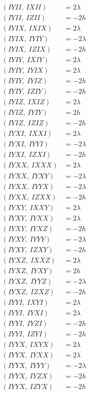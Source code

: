 \documentclass{article}
\begin{document}
\begin{align*}
  (IYII,\ IXII) &= 2 \lambda \\
  (IYII,\ IZII) &= - 2 h \\
  (IYIX,\ IXIX) &= 2 \lambda \\
  (IYIX,\ IYIY) &= - 2 \lambda \\
  (IYIX,\ IZIX) &= - 2 h \\
  (IYIY,\ IXIY) &= 2 \lambda \\
  (IYIY,\ IYIX) &= 2 \lambda \\
  (IYIY,\ IYIZ) &= - 2 h \\
  (IYIY,\ IZIY) &= - 2 h \\
  (IYIZ,\ IXIZ) &= 2 \lambda \\
  (IYIZ,\ IYIY) &= 2 h \\
  (IYIZ,\ IZIZ) &= - 2 h \\
  (IYXI,\ IXXI) &= 2 \lambda \\
  (IYXI,\ IYYI) &= - 2 \lambda \\
  (IYXI,\ IZXI) &= - 2 h \\
  (IYXX,\ IXXX) &= 2 \lambda \\
  (IYXX,\ IYXY) &= - 2 \lambda \\
  (IYXX,\ IYYX) &= - 2 \lambda \\
  (IYXX,\ IZXX) &= - 2 h \\
  (IYXY,\ IXXY) &= 2 \lambda \\
  (IYXY,\ IYXX) &= 2 \lambda \\
  (IYXY,\ IYXZ) &= - 2 h \\
  (IYXY,\ IYYY) &= - 2 \lambda \\
  (IYXY,\ IZXY) &= - 2 h \\
  (IYXZ,\ IXXZ) &= 2 \lambda \\
  (IYXZ,\ IYXY) &= 2 h \\
  (IYXZ,\ IYYZ) &= - 2 \lambda \\
  (IYXZ,\ IZXZ) &= - 2 h \\
  (IYYI,\ IXYI) &= 2 \lambda \\
  (IYYI,\ IYXI) &= 2 \lambda \\
  (IYYI,\ IYZI) &= - 2 h \\
  (IYYI,\ IZYI) &= - 2 h \\
  (IYYX,\ IXYX) &= 2 \lambda \\
  (IYYX,\ IYXX) &= 2 \lambda \\
  (IYYX,\ IYYY) &= - 2 \lambda \\
  (IYYX,\ IYZX) &= - 2 h \\
  (IYYX,\ IZYX) &= - 2 h \\

\end{align*}
\end{document}
